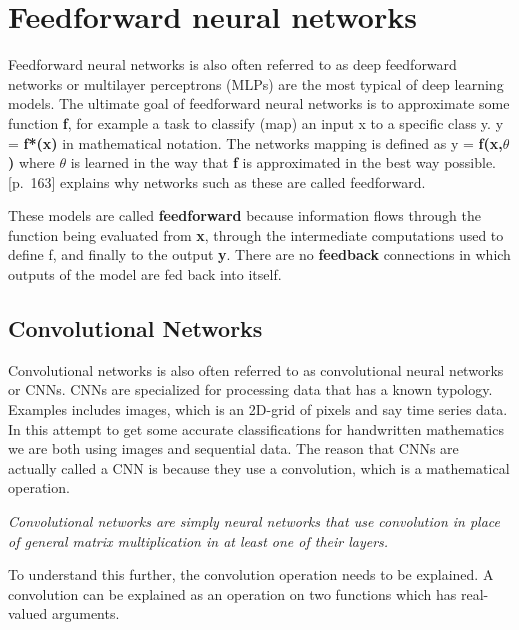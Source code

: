 \section{Feedforward neural networks}
% 
Feedforward neural networks is also often referred to as deep feedforward networks or multilayer perceptrons (MLPs) are the most typical of deep learning models. The ultimate goal of feedforward neural networks is to approximate some function \textbf{f}, for example a task to classify (map) an input x to a specific class y. y = \textbf{f*(x)} in mathematical notation. The networks mapping is defined as y = \textbf{f(x,$\theta$)} where $\theta$ is learned in the way that \textbf{f} is approximated in the best way possible. \\ 
\cite{goodfellow_deep_2016}[p.~163] explains why networks such as these are called feedforward.
\begin{displayquote}
These models are called \textbf{feedforward} because information flows through the function being evaluated from \textbf{x}, through the intermediate computations used to define f, and finally to the output \textbf{y}. There are no \textbf{feedback} connections in which outputs of the model are fed back into itself.
\end{displayquote}



\subsection{Convolutional Networks}
% 
Convolutional networks is also often referred to as convolutional neural networks or CNNs. CNNs are specialized for processing data that has a known typology. Examples includes images, which is an 2D-grid of pixels and say time series data. In this attempt to get some accurate classifications for handwritten mathematics we are both using images and sequential data. The reason that CNNs are actually called a CNN is because they use a convolution, which is a mathematical operation.
\begin{displayquote}
 \textit{Convolutional networks are simply neural networks that use convolution in place of general matrix multiplication in at least one of their layers.}
\end{displayquote}
To understand this further, the convolution operation needs to be explained. A convolution can be explained as an operation on two functions which has real-valued arguments.\\ 

